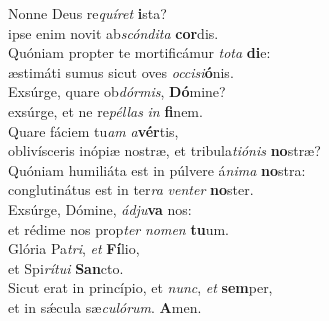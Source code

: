 \oddverse Nonne Deus re\textit{quí}\textit{ret} \textbf{i}sta?~\*\\
\oddverse ipse enim novit ab\textit{scón}\textit{di}\textit{ta} \textbf{cor}dis.\\
\evenverse Quóniam propter te mortificámur \textit{to}\textit{ta} \textbf{di}e:~\*\\
\evenverse æstimáti sumus sicut oves \textit{oc}\textit{ci}\textit{si}\textbf{ó}nis.\\
\oddverse Exsúrge, quare ob\textit{dór}\textit{mis}, \textbf{Dó}mine?~\*\\
\oddverse exsúrge, et ne re\textit{pél}\textit{las} \textit{in} \textbf{fi}nem.\\
\evenverse Quare fáciem tu\textit{am} \textit{a}\textbf{vér}tis,~\*\\
\evenverse oblivísceris inópiæ nostræ, et tribula\textit{ti}\textit{ó}\textit{nis} \textbf{no}stræ?\\
\oddverse Quóniam humiliáta est in púlvere á\textit{ni}\textit{ma} \textbf{no}stra:~\*\\
\oddverse conglutinátus est in ter\textit{ra} \textit{ven}\textit{ter} \textbf{no}ster.\\
\evenverse Exsúrge, Dómine, \textit{ád}\textit{ju}\textbf{va} nos:~\*\\
\evenverse et rédime nos prop\textit{ter} \textit{no}\textit{men} \textbf{tu}um.\\
\oddverse Glória Pa\textit{tri}, \textit{et} \textbf{Fí}lio,~\*\\
\oddverse et Spi\textit{rí}\textit{tu}\textit{i} \textbf{San}cto.\\
\evenverse Sicut erat in princípio, et \textit{nunc}, \textit{et} \textbf{sem}per,~\*\\
\evenverse et in sǽcula sæ\textit{cu}\textit{ló}\textit{rum}. \textbf{A}men.\\

